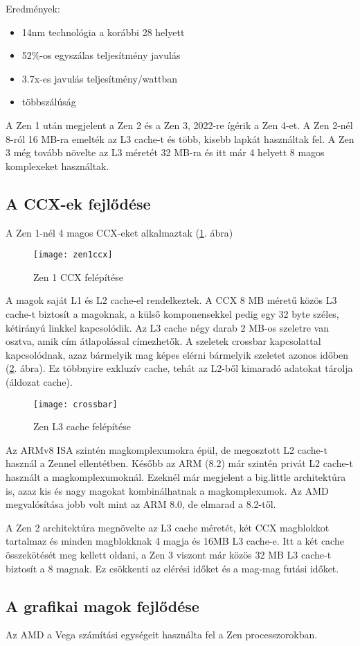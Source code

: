 Eredmények:
\begin{itemize}
    \item 14nm technológia a korábbi 28 helyett
    \item 52\%-os egyszálas teljesítmény javulás
    \item 3.7x-es javulás teljesítmény/wattban
    \item többszálúság
\end{itemize}

A Zen 1 után megjelent a Zen 2 és a Zen 3, 2022-re ígérik a Zen 4-et.
A Zen 2-nél 8-ról 16 MB-ra emelték az L3 cache-t és több, kisebb lapkát használtak fel.
A Zen 3 még tovább növelte az L3 méretét 32 MB-ra és itt már 4 helyett 8 magos komplexeket használtak.

\subsection{A CCX-ek fejlődése}
A Zen 1-nél 4 magos CCX-eket alkalmaztak (\ref{fig:zen1ccx}. ábra)
\begin{figure}[H]
    \texttt{[image: zen1ccx]}
    \centering
    \caption{Zen 1 CCX felépítése}
    \label{fig:zen1ccx}
\end{figure}
A magok saját L1 és L2 cache-el rendelkeztek.
A CCX 8 MB méretű közös L3 cache-t biztosít a magoknak, a külső komponensekkel pedig egy 32 byte széles, kétirányú linkkel kapcsolódik.
Az L3 cache négy darab 2 MB-os szeletre van osztva, amik cím átlapolással címezhetők.
A szeletek crossbar kapcsolattal kapcsolódnak, azaz bármelyik mag képes elérni bármelyik szeletet azonos időben (\ref{fig:crossbar}. ábra).
Ez többnyire exkluzív cache, tehát az L2-ből kimaradó adatokat tárolja (áldozat cache).
\begin{figure}[H]
    \texttt{[image: crossbar]}
    \centering
    \caption{Zen L3 cache felépítése}
    \label{fig:crossbar}
\end{figure}

Az ARMv8 ISA szintén magkomplexumokra épül, de megosztott L2 cache-t használ a Zennel ellentétben.
Később az ARM (8.2) már szintén privát L2 cache-t használt a magkomplexumoknál.
Ezeknél már megjelent a big.little architektúra is, azaz kis és nagy magokat kombinálhatnak a magkomplexumok.
Az AMD megvalósítása jobb volt mint az ARM 8.0, de elmarad a 8.2-től.

A Zen 2 architektúra megnövelte az L3 cache méretét, két CCX magblokkot tartalmaz és minden magblokknak 4 magja és 16MB L3 cache-e.
Itt a két cache összekötését meg kellett oldani, a Zen 3 viszont már közös 32 MB L3 cache-t biztosít a 8 magnak.
Ez csökkenti az elérési időket és a mag-mag futási időket.

\subsection{A grafikai magok fejlődése}
Az AMD a Vega számítási egységeit használta fel a Zen processzorokban.
